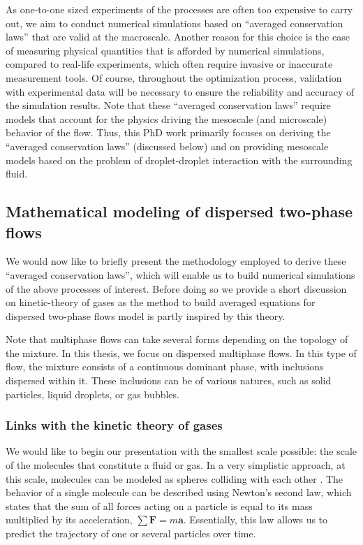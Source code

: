 As one-to-one sized experiments of the processes are often too expensive to carry out, we aim to conduct numerical simulations based on ``averaged conservation laws'' that are valid at the macroscale. 
Another reason for this choice is the ease of measuring physical quantities that is afforded by numerical simulations, compared to real-life experiments, which often require invasive or inaccurate measurement tools.
Of course, throughout the optimization process, validation with experimental data will be necessary to ensure the reliability and accuracy of the simulation results. 
Note that these ``averaged conservation laws'' require models that account for the physics driving the mesoscale (and microscale) behavior of the flow. 
Thus, this PhD work primarily focuses on deriving the ``averaged conservation laws'' (discussed below) and on providing mesoscale models based on the problem of droplet-droplet interaction with the surrounding fluid.

\subsection{Mathematical modeling of dispersed two-phase flows }

We would now like to briefly present the methodology employed to derive these ``averaged conservation laws'', which will enable us to build numerical simulations of the above processes of interest.
Before doing so we provide a short discussion on kinetic-theory of gases as the method to build averaged equations for dispersed two-phase flows model is partly inspired by this theory. 

Note that multiphase flows can take several forms depending on the topology of the mixture. In this thesis, we focus on dispersed multiphase flows.
In this type of flow, the mixture consists of a continuous dominant phase, with inclusions dispersed within it. These inclusions can be of various natures, such as solid particles, liquid droplets, or gas bubbles.

\subsubsection{Links with the kinetic theory of gases}

We would like to begin our presentation with the smallest scale possible: the scale of the molecules that constitute a fluid or gas.
In a very simplistic approach, at this scale, molecules can be modeled as spheres colliding with each other \citep{kardar2007statistical}. 
The behavior of a single molecule can be described using Newton's second law, which states that the sum of all forces acting on a particle is equal to its mass multiplied by its acceleration, $\sum\textbf{F} = m \textbf{a}$. 
Essentially, this law allows us to predict the trajectory of one or several particles over time. 


